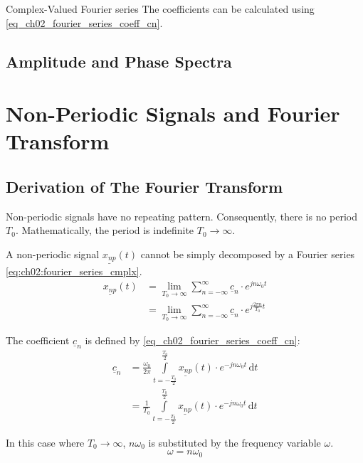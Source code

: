 \begin{refsection}
\begin{definition}{Complex-Valued Fourier series}
	The coefficients can be calculated using \eqref{eq_ch02_fourier_series_coeff_cn}.
\end{definition}

\subsection{Amplitude and Phase Spectra}

\section{Non-Periodic Signals and Fourier Transform}

\subsection{Derivation of The Fourier Transform}

Non-periodic signals have no repeating pattern. Consequently, there is no period $T_0$. Mathematically, the period is indefinite $T_0 \rightarrow \infty$.

A non-periodic signal $\underline{x_{np}}(t)$ cannot be simply decomposed by a Fourier series \eqref{eq:ch02:fourier_series_cmplx}.
\begin{equation}
	\begin{split}
		\underline{x_{np}}(t) &= \lim\limits_{T_0 \rightarrow \infty} \sum\limits_{n = -\infty}^{\infty} \underline{c}_n \cdot e^{j n \omega_0 t} \\
		 &= \lim\limits_{T_0 \rightarrow \infty} \sum\limits_{n = -\infty}^{\infty} \underline{c}_n \cdot e^{j \frac{2 \pi n}{T_0} t}
	\end{split}
	\label{eq:ch02:sig_np_fourier_series}
\end{equation}

The coefficient $\underline{c}_n$ is defined by \eqref{eq_ch02_fourier_series_coeff_cn}:
\begin{equation*}
	\begin{split}
		\underline{c}_n &= \frac{\omega_0}{2 \pi} \int\limits_{t = -\frac{T_0}{2}}^{\frac{T_0}{2}} \underline{x_{np}}(t) \cdot e^{-j n \omega_0 t} \, \mathrm{d} t \\
		 &= \frac{1}{T_0} \int\limits_{t = -\frac{T_0}{2}}^{\frac{T_0}{2}} \underline{x_{np}}(t) \cdot e^{-j n \omega_0 t} \, \mathrm{d} t
	\end{split}
	\label{eq:ch02:sig_np_cn}
\end{equation*}

In this case where $T_0 \rightarrow \infty$, $n \omega_0$ is substituted by the frequency variable $\omega$.
\begin{equation}
	\omega = n \omega_0
	\label{eq:ch02:omega_subst}
\end{equation}


\end{refsection}
